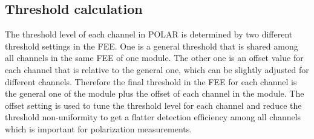 \documentclass[preprint,sort&compress,12pt]{elsarticle}
\begin{document}
\subsection{Threshold calculation}\label{sec:threshold_calculation}

The threshold level of each channel in POLAR is determined by two different threshold settings in the FEE. One is a general threshold that is shared among all channels in the same FEE of one module. The other one is an offset value for each channel that is relative to the general one, which can be slightly adjusted for different channels. Therefore the final threshold in the FEE for each channel is the general one of the module plus the offset of each channel in the module. The offset setting is used to tune the threshold level for each channel and reduce the threshold non-uniformity to get a flatter detection efficiency among all channels which is important for polarization measurements. 
\end{document}
